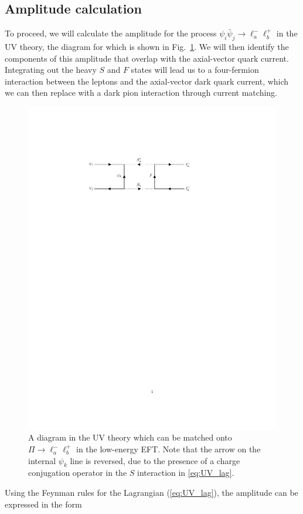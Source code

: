 \subsection{Amplitude calculation}

To proceed, we will calculate the amplitude for the process $\psi_i \bar{\psi}_j\rightarrow \ell_a^- \ell_b^+$ in the UV theory, the diagram for which is shown in Fig.~\ref{fig:matching_diagram}.  We will then identify the components of this amplitude that overlap with the axial-vector quark current.  Integrating out the heavy $S$ and $F$ states will lead us to a four-fermion interaction between the leptons and the axial-vector dark quark current, which we can then replace with a dark pion interaction through current matching.
\begin{figure}[t!]
    \centering
    \includegraphics[width=0.8\linewidth]{figures/appendixA/dark_pion_matching_diagram.pdf}
    \caption[UV matching diagram]{A diagram in the UV theory which can be matched onto $\Pi\rightarrow \ell_a^- \ell_b^+$ in the low-energy EFT. Note that the arrow on the internal $\psi_k$ line is reversed, due to the presence of a charge conjugation operator in the $S$ interaction in \ref{eq:UV_lag}.}
    \label{fig:matching_diagram}
\end{figure}
Using the Feynman rules for the Lagrangian (\ref{eq:UV_lag}), the amplitude can be expressed in the form
